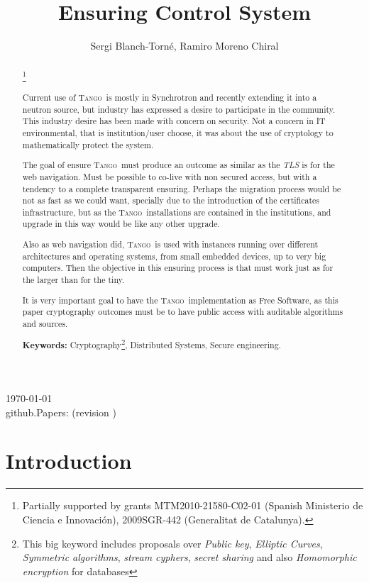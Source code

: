 \documentclass[10pt,a4paper,twoside]{llncs}
\title{Ensuring \tango Control System}
\author{Sergi Blanch-Torn\'e\inst{1}, Ramiro Moreno Chiral\inst{2}}
\institute{
 Escola Polit\`ecnica Superior, Universitat de Lleida. Spain.\\
 \email{\tt sblanch@alumnes.udl.es}
 \and 
 Departament de Matem\`atica. Universitat de Lleida. Spain.\\
 \email{\tt ramiro@matematica.udl.es}
 }
\newcommand{\version}{github.Papers: \gitCommitterDate\;(revision \gitAbbrevHash) }
\newcommand{\tango}{\textsc{Tango}}
\begin{document}
\maketitle
\begin{center}
 \today\\
 \version
\end{center}


\begin{abstract}\footnote{Partially supported by grants MTM2010-21580-C02-01 (Spanish Ministerio de Ciencia e Innovaci\'on), 2009SGR-442 (Generalitat de Catalunya).}

Current use of \tango\, is mostly in Synchrotron and recently extending it into a neutron source, but industry has expressed a desire to participate in the community. This industry desire has been made with concern on security. Not a concern in IT environmental, that is institution/user choose, it was about the use of cryptology to mathematically protect the system.

The goal of ensure \tango\, must produce an outcome as similar as the \emph{TLS} is for the web navigation. Must be possible to co-live with non secured access, but with a tendency to a complete transparent ensuring. Perhaps the migration process would be not as fast as we could want, specially due to the introduction of the certificates infrastructure, but as the \tango\, installations are contained in the institutions, and upgrade in this way would be like any other upgrade.

Also as web navigation did, \tango\, is used with instances running over different architectures and operating systems, from small embedded devices, up to very big computers. Then the objective in this ensuring process is that must work just as for the larger than for the tiny.

It is very important goal to have the \tango\, implementation as Free Software, as this paper cryptography outcomes must be to have public access with auditable algorithms and sources.
   
{\bf Keywords:} Cryptography\footnote{This big keyword includes proposals over \emph{Public key}, \emph{Elliptic Curves}, \emph{Symmetric algorithms}, \emph{stream cyphers}, \emph{secret sharing} and also \emph{Homomorphic encryption} for databases}, Distributed Systems, Secure engineering.

\end{abstract}

%
\section{Introduction \label{sec:intro}}
\end{document}
